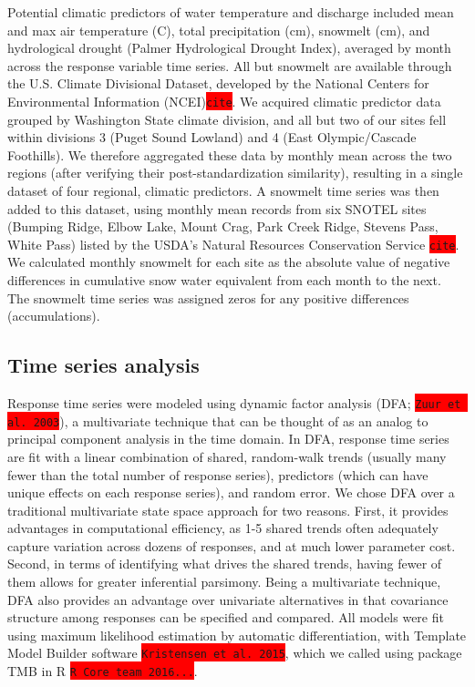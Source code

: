 \documentclass{article}
\begin{document}
Potential climatic predictors of water temperature and discharge included mean and max air temperature (\degree C), total precipitation (cm), snowmelt (cm), and hydrological drought (Palmer Hydrological Drought Index), averaged by month across the response variable time series. All but snowmelt are available through the U.S. Climate Divisional Dataset, developed by the National Centers for Environmental Information (NCEI)\colorbox{red}{\lstinline{cite}}. We acquired climatic predictor data grouped by Washington State climate division, and all but two of our sites fell within divisions 3 (Puget Sound Lowland) and 4 (East Olympic/Cascade Foothills). We therefore aggregated these data by monthly mean across the two regions (after verifying their post-standardization similarity), resulting in a single dataset of four regional, climatic predictors. A snowmelt time series was then added to this dataset, using monthly mean records from six SNOTEL sites (Bumping Ridge, Elbow Lake, Mount Crag, Park Creek Ridge, Stevens Pass, White Pass) listed by the USDA's Natural Resources Conservation Service \colorbox{red}{\lstinline{cite}}. We calculated monthly snowmelt for each site as the absolute value of negative differences in cumulative snow water equivalent from each month to the next. The snowmelt time series was assigned zeros for any positive differences (accumulations). 


\subsection*{Time series analysis}

Response time series were modeled using dynamic factor analysis (DFA; \colorbox{red}{\lstinline{Zuur et al. 2003}}), a multivariate technique that can be thought of as an analog to principal component analysis in the time domain. In DFA, response time series are fit with a linear combination of shared, random-walk trends (usually many fewer than the total number of response series), predictors (which can have unique effects on each response series), and random error. We chose DFA over a traditional multivariate state space approach for two reasons. First, it provides advantages in computational efficiency, as 1-5 shared trends often adequately capture variation across dozens of responses, and at much lower parameter cost. Second, in terms of identifying what drives the shared trends, having fewer of them allows for greater inferential parsimony. Being a multivariate technique, DFA also provides an advantage over univariate alternatives in that covariance structure among responses can be specified and compared. All models were fit using maximum likelihood estimation by automatic differentiation, with Template Model Builder software \colorbox{red}{\lstinline{Kristensen et al. 2015}}, which we called using package TMB in R \colorbox{red}{\lstinline{R Core team 2016...}}.
\end{document}
